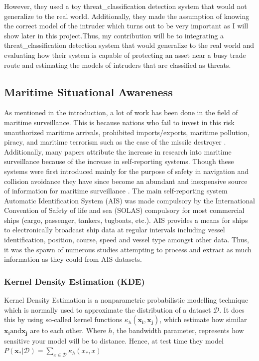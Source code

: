 \documentclass[bsc,frontabs,twoside,singlespacing,parskip,deptreport]{infthesis}     %
\begin{document}
However, they used a toy threat_classification detection system that would not generalize to the real world. Additionally, they made the assumption of knowing the correct model of the intruder which turns out to be very important as I will show later in this project.Thus, my contribution will be to integrating a threat_classification detection system that would generalize to the real world and evaluating how their system is capable of protecting an asset near a busy trade route and estimating the models of intruders that are classified as threats.

\subsection{Maritime Situational Awareness}
As mentioned in the introduction, a lot of work has been done in the field of maritime surveillance. This is because nations who fail to invest in this risk unauthorized maritime arrivals, prohibited imports/exports, maritime pollution, piracy, and maritime terrorism \cite{ristic2008statistical} such as the case of the missile destroyer \cite{combs2009encyclopedia}. Additionally, many papers attribute the increase in research into maritime surveillance because of the increase in self-reporting systems. Though these systems were first introduced mainly for the purpose of safety in navigation and collision avoidance they have since become an abundant and inexpensive source of information for maritime surveillance  \cite{kde}. The main self-reporting system Automatic Identification System (AIS) was made compulsory by the International Convention of Safety of life and sea (SOLAS) compulsory for most commercial ships (cargo, passenger, tankers, tugboats, etc.). AIS provides a means for ships to electronically broadcast ship data at regular intervals including vessel identification, position, course, speed and vessel type amongst other data. Thus, it was the spawn of numerous studies attempting to process and extract as much information as they could from AIS datasets. 

\subsubsection{Kernel Density Estimation (KDE)}
\label{sss:kde}
Kernel Density Estimation is a nonparametric probabilistic modelling technique which is normally used to approximate the distribution of a dataset $\mathcal{D}$. It does this by using so-called kernel functions $\kappa_h(\mathbf{x_i}, \mathbf{x_j})$, which estimate how similar $\mathbf{x_i} \text{and} \mathbf{x_j}$ are to each other. Where $h$, the bandwidth parameter, represents how sensitive your model will be to distance. Hence, at test time they model $P(\mathbf{x_*}|\mathcal{D}) = \sum_{x \in \mathcal{D}} \kappa_h(x_*, x)$
\end{document}
